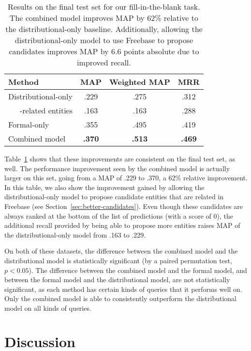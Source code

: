 \documentclass[11pt]{article}
\newcommand{\secref}[1]{Section~\ref{sec:#1}}
\newcommand{\tabref}[1]{Table~\ref{tab:#1}}
\begin{document}
\begin{table}
  \centering
  {\small
    \begin{tabular}{lccc}
      \toprule
      Method & MAP & Weighted MAP & MRR \\
      \midrule
      Distributional-only & .229 & .275 & .312 \\
      \ \ \ -related entities & .163 & .163 & .288 \\
      \midrule
      Formal-only & .355 & .495 & .419 \\
      \midrule
      Combined model & \textbf{.370} & \textbf{.513} & \textbf{.469} \\
      \bottomrule
    \end{tabular}
  }
  \caption{Results on the final test set for our fill-in-the-blank task.  The
  combined model improves MAP by 62\% relative to the distributional-only
  baseline.  Additionally, allowing the distributional-only model to use
  Freebase to propose candidates improves MAP by 6.6 points absolute due to
  improved recall.}
  \label{tab:final-results}
\end{table}

\tabref{final-results} shows that these improvements are consistent on the
final test set, as well.  The performance improvement seen by the combined
model is actually larger on this set, going from a MAP of .229 to .370, a 62\%
relative improvement.  In this table, we also show the improvement gained by
allowing the distributional-only model to propose candidate entities that are
related in Freebase (see \secref{better-candidates}).  Even though these
candidates are always ranked at the bottom of the list of predictions (with a
score of 0), the additional recall provided by being able to propose more
entities raises MAP of the distributional-only model from .163 to .229.

On both of these datasets, the difference between the combined model and the
distributional model is statistically significant (by a paired permutation
test, $p < 0.05$).  The difference between the combined model and the formal
model, and between the formal model and the distributional model, are not
statistically significant, as each method has certain kinds of queries that it
performs well on.  Only the combined model is able to consistently outperform
the distributional model on all kinds of queries.

\section{Discussion}
\label{sec:discussion}
\end{document}
